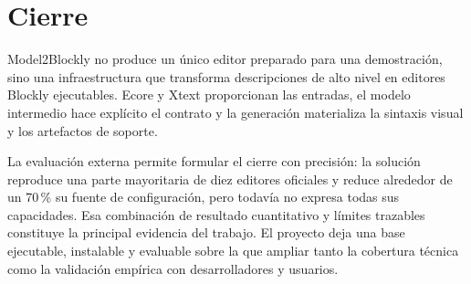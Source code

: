 \section{Cierre}
\label{sec:cierre}

Model2Blockly no produce un único editor preparado para una demostración, sino
una infraestructura que transforma descripciones de alto nivel en editores
Blockly ejecutables. Ecore y Xtext proporcionan las entradas, el modelo
intermedio hace explícito el contrato y la generación materializa la sintaxis
visual y los artefactos de soporte.

La evaluación externa permite formular el cierre con precisión: la solución
reproduce una parte mayoritaria de diez editores oficiales y reduce alrededor
de un 70\,\% su fuente de configuración, pero todavía no expresa todas sus
capacidades. Esa combinación de resultado cuantitativo y límites trazables
constituye la principal evidencia del trabajo. El proyecto deja una base
ejecutable, instalable y evaluable sobre la que ampliar tanto la cobertura
técnica como la validación empírica con desarrolladores y usuarios.

